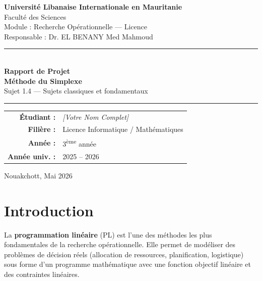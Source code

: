 \documentclass[12pt,a4paper]{article}
\begin{document}
\begin{titlepage}
  \centering
  \vspace*{1cm}

  {\Large \textbf{Université Libanaise Internationale en Mauritanie}}\\[0.3cm]
  {\large Faculté des Sciences}\\[0.1cm]
  {\large Module : Recherche Opérationnelle — Licence}\\[0.1cm]
  {\large Responsable : Dr. EL BENANY Med Mahmoud}

  \vspace{1.5cm}
  \rule{\textwidth}{1.5pt}\\[0.4cm]
  {\LARGE \textbf{\textcolor{bleuLIU}{Rapport de Projet}}}\\[0.3cm]
  {\huge \textbf{Méthode du Simplexe}}\\[0.3cm]
  {\large Sujet 1.4 — Sujets classiques et fondamentaux}\\[0.2cm]
  \rule{\textwidth}{1.5pt}

  \vspace{1.5cm}

  \begin{tabular}{rl}
    \textbf{Étudiant :}   & \textit{[Votre Nom Complet]} \\[0.3cm]
    \textbf{Filière :}    & Licence Informatique / Mathématiques \\[0.3cm]
    \textbf{Année :}      & 3\textsuperscript{ème} année \\[0.3cm]
    \textbf{Année univ. :}& 2025 -- 2026 \\
  \end{tabular}

  \vfill
  {\large Nouakchott, Mai 2026}
\end{titlepage}

\tableofcontents
\newpage

\section{Introduction}

La \textbf{programmation linéaire} (PL) est l'une des méthodes les plus 
fondamentales de la recherche opérationnelle. Elle permet de modéliser 
des problèmes de décision réels (allocation de ressources, planification, 
logistique) sous forme d'un programme mathématique avec une fonction 
objectif linéaire et des contraintes linéaires.
\end{document}
